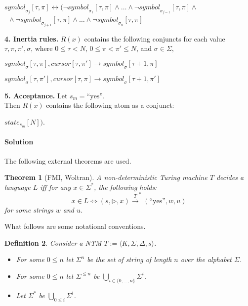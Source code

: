 \documentclass [11pt]{article}
\newtheorem{theorem}{Theorem}
\newtheorem{definition}[theorem]{Definition}
\newcommand{\ra}{\rightarrow}
\newcommand{\lto}{\rightarrow}
\newcommand{\yess}{\mbox{``yes''}}
\newcommand{\sym}[3]{\textit{symbol}_{#1}[#2,#3]}
\newcommand{\cursor}[2]{\textit{cursor}[#1,#2]}
\newcommand{\state}[2]{\textit{state}_{#1}[#2]}
\begin{document}
\noindent
$\sym{\sigma_j}{\tau}{\pi} \leftrightarrow
(\neg \sym{\sigma_1}{\tau}{\pi} \wedge \dots \wedge
\neg \sym{\sigma_{j-1}}{\tau}{\pi} \wedge \mbox{}$ \\
\mbox{} \quad \ $\mbox{}\wedge 
\neg \sym{\sigma_{j+1}}{\tau}{\pi} \wedge \dots \wedge
\neg \sym{\sigma_{n}}{\tau}{\pi}$


\smallskip 
\noindent
{\bf 4. Inertia rules.} 
$R(x)$ contains the
following conjuncts for each value $\tau, \pi, \pi', \sigma$,
where $0 \leq \tau < N$, $0 \leq \pi < \pi' \leq N$, and
$\sigma \in \Sigma$, 


\smallskip 

\noindent
$\sym{\sigma}{\tau}{\pi}, \cursor{\tau}{\pi'} \ra 
\sym{\sigma}{\tau+1}{\pi}$

\noindent
$\sym{\sigma}{\tau}{\pi'}, \cursor{\tau}{\pi} \ra 
\sym{\sigma}{\tau+1}{\pi'}$


\smallskip 
\noindent



{\bf 5. Acceptance.} 
Let $s_m = \yess$. \\
Then  $R(x)$ contains the following atom as a conjunct:

\smallskip

\noindent
$\state{s_m}{N})$.



\newpage


\paragraph*{Solution}


The following external theorems are used.
\begin{theorem}[FMI, Woltran]
\label{thrm:fm-ndt-deciding}
A non-deterministic Turing machine $T$ decides a language $L$ iff for any $x \in \Sigma^*$, the following holds:
\begin{equation*}
x \in L \iff (s,\triangleright,x) \stackrel{T}{\lto}^* (\yess, w,u) 
\end{equation*}
for some strings $w$ and $u$. 
\end{theorem}


What follows are some notational conventions.

\begin{definition}
Consider a NTM $T:=\langle K, \Sigma, \Delta, s \rangle$. 
\begin{itemize}
\item For some $0 \leq n$ let $\Sigma^n$ be the set of string of length $n$ over the alphabet $\Sigma$.
\item For some $0 \leq n$ let $\Sigma^{\leq n}$ be $\bigcup_{i \in \{0 , \dots , n\}} \Sigma^i$.
\item Let $\Sigma^*$ be $\bigcup_{0 \leq i} \Sigma^i$.
\end{itemize}
\end{definition}
\end{document}

